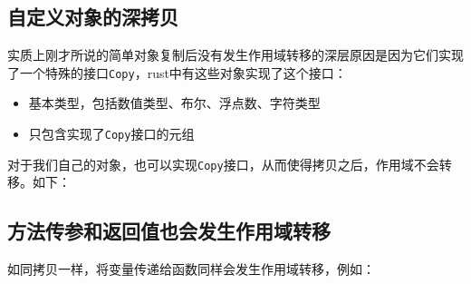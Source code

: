 \documentclass[12pt]{article}
\begin{document}
\subsection{自定义对象的深拷贝}\label{ux81eaux5b9aux4e49ux5bf9ux8c61ux7684ux6df1ux62f7ux8d1d}

实质上刚才所说的简单对象复制后没有发生作用域转移的深层原因是因为它们实现了一个特殊的接口\texttt{Copy}，rust中有这些对象实现了这个接口：

\begin{itemize}
\tightlist
\item
  基本类型，包括数值类型、布尔、浮点数、字符类型
\item
  只包含实现了\texttt{Copy}接口的元组
\end{itemize}

对于我们自己的对象，也可以实现\texttt{Copy}接口，从而使得拷贝之后，作用域不会转移。如下：

\begin{Shaded}
\begin{Highlighting}[]
\AttributeTok{\#[}\AttributeTok{(}\OperatorTok{,} \OperatorTok{,} \AttributeTok{)]}
\OperatorTok{\{}
\OperatorTok{:} \OperatorTok{,}
\OperatorTok{:} \OperatorTok{,}
\OperatorTok{\}}

\OperatorTok{\{}
    \OperatorTok{=}\OperatorTok{\{}\OperatorTok{:} \OperatorTok{,}\OperatorTok{:}  \OperatorTok{\};}
    \OperatorTok{=}\OperatorTok{;}
    \NormalTok{(}\OperatorTok{,}\OperatorTok{;} 
\OperatorTok{\}}
\end{Highlighting}
\end{Shaded}

\subsection{方法传参和返回值也会发生作用域转移}\label{ux65b9ux6cd5ux4f20ux53c2ux548cux8fd4ux56deux503cux4e5fux4f1aux53d1ux751fux4f5cux7528ux57dfux8f6cux79fb}

如同拷贝一样，将变量传递给函数同样会发生作用域转移，例如：
\end{document}

